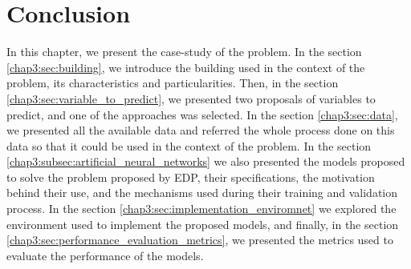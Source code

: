 \section{Conclusion}\label{chap3:sec:conclusion}

In this chapter, we present the case-study of the problem. In the section \ref{chap3:sec:building}, we introduce the building used in the context of the problem, its characteristics and particularities. Then, in the section \ref{chap3:sec:variable_to_predict}, we presented two proposals of variables to predict, and one of the approaches was selected. In the section \ref{chap3:sec:data}, we presented all the available data and referred the whole process done on this data so that it could be used in the context of the problem.  In the section \ref{chap3:subsec:artificial_neural_networks} we also presented the models proposed to solve the problem proposed by \ac{EDP}, their specifications, the motivation behind their use, and the mechanisms used during their training and validation process. In the section \ref{chap3:sec:implementation_enviromnet} we explored the environment used to implement the proposed models, and finally, in the section \ref{chap3:sec:performance_evaluation_metrics}, we presented the metrics used to evaluate the performance of the models.